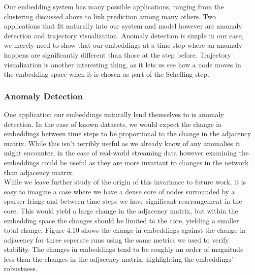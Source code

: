 \documentclass[12pt,twoside]{report}
\begin{document}
Our embedding system has many possible applications, ranging from the clustering discussed above to link prediction among many others. Two applications that fit naturally into our system and model however are anomaly detection and trajectory visualization. Anomaly detection is simple in our case, we merely need to show that our embeddings at a time step where an anomaly happens are significantly different than those at the step before. Trajectory visualization is another interesting thing, as it lets us see how a node moves in the embedding space when it is chosen as part of the Schelling step. \\

\subsubsection{Anomaly Detection}

One application our embeddings naturally lend themselves to is anomaly detection. In the case of known datasets, we would expect the change in embeddings between time steps to be proportional to the change in the adjacency matrix. While this isn't terribly useful as we already know of any anomalies it might encounter, in the case of real-world streaming data however examining the embeddings could be useful as they are more invariant to changes in the network than adjacency matrix. \\

While we leave further study of the origin of this invariance to future work, it is easy to imagine a case where we have a dense core of nodes surrounded by a sparser fringe and between time steps we have significant rearrangement in the core. This would yield a large change in the adjacency matrix, but within the embedding space the changes should be limited to the core, yielding a smaller total change. Figure 4.10 shows the change in embeddings against the change in adjacency for three seperate runs using the same metrics we used to verify stability. The changes in embeddings tend to be roughly an order of magnitude less than the changes in the adjacency matrix, highlighting the embeddings' robustness.  \\
\end{document}
